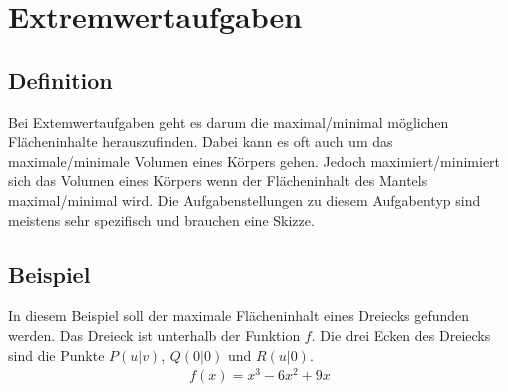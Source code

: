 \begin{center}
\end{center}

\section{Extremwertaufgaben}
\subsection{Definition}
\begin{flushleft}   
    Bei Extemwertaufgaben geht es darum die maximal/minimal möglichen Flächeninhalte herauszufinden.
    Dabei kann es oft auch um das maximale/minimale Volumen eines Körpers gehen.
    Jedoch maximiert/minimiert sich das Volumen eines Körpers wenn der Flächeninhalt des Mantels maximal/minimal wird.
    Die Aufgabenstellungen zu diesem Aufgabentyp sind meistens sehr spezifisch und brauchen eine Skizze.
\end{flushleft}

\subsection{Beispiel}
\begin{flushleft}
    In diesem Beispiel soll der maximale Flächeninhalt eines Dreiecks gefunden werden.
    Das Dreieck ist unterhalb der Funktion $f$.
    Die drei Ecken des Dreiecks sind die Punkte $P(u|v)$, $Q(0|0)$ und $R(u|0)$.
    \begin{align}
        f(x)=x^3-6x^2+9x
    \end{align}
\end{flushleft}

\begin{center}
\end{center}

